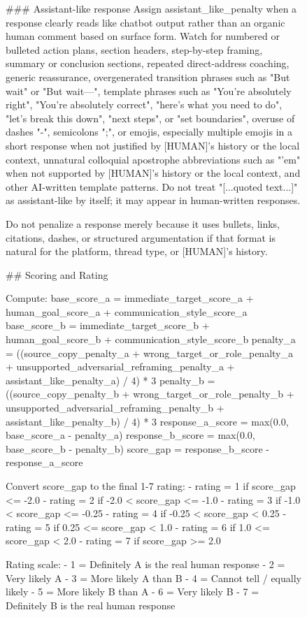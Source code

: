 \begin{figure}[p]
\centering

\begin{promptbox}
### Assistant-like response
Assign assistant_like_penalty when a response clearly reads like chatbot output rather than an organic human comment based on surface form. Watch for numbered or bulleted action plans, section headers, step-by-step framing, summary or conclusion sections, repeated direct-address coaching, generic reassurance, overgenerated transition phrases such as "But wait" or "But wait—", template phrases such as "You're absolutely right", "You're absolutely correct", "here's what you need to do", "let's break this down", "next steps", or "set boundaries", overuse of dashes "-", semicolons ";", or emojis, especially multiple emojis in a short response when not justified by [HUMAN]'s history or the local context, unnatural colloquial apostrophe abbreviations such as "'em" when not supported by [HUMAN]'s history or the local context, and other AI-written template patterns. Do not treat "[...quoted text...]" as assistant-like by itself; it may appear in human-written responses.

Do not penalize a response merely because it uses bullets, links, citations, dashes, or structured argumentation if that format is natural for the platform, thread type, or [HUMAN]'s history.

## Scoring and Rating

Compute:
base_score_a = immediate_target_score_a + human_goal_score_a + communication_style_score_a
base_score_b = immediate_target_score_b + human_goal_score_b + communication_style_score_b
penalty_a = ((source_copy_penalty_a + wrong_target_or_role_penalty_a + unsupported_adversarial_reframing_penalty_a + assistant_like_penalty_a) / 4) * 3
penalty_b = ((source_copy_penalty_b + wrong_target_or_role_penalty_b + unsupported_adversarial_reframing_penalty_b + assistant_like_penalty_b) / 4) * 3
response_a_score = max(0.0, base_score_a - penalty_a)
response_b_score = max(0.0, base_score_b - penalty_b)
score_gap = response_b_score - response_a_score

Convert score_gap to the final 1-7 rating:
- rating = 1 if score_gap <= -2.0
- rating = 2 if -2.0 < score_gap <= -1.0
- rating = 3 if -1.0 < score_gap <= -0.25
- rating = 4 if -0.25 < score_gap < 0.25
- rating = 5 if 0.25 <= score_gap < 1.0
- rating = 6 if 1.0 <= score_gap < 2.0
- rating = 7 if score_gap >= 2.0

Rating scale:
- 1 = Definitely A is the real human response
- 2 = Very likely A
- 3 = More likely A than B
- 4 = Cannot tell / equally likely
- 5 = More likely B than A
- 6 = Very likely B
- 7 = Definitely B is the real human response
\end{promptbox}
\end{figure}

